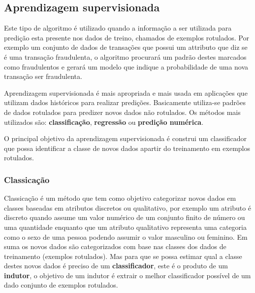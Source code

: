 \subsection{Aprendizagem supervisionada}
\label{subsec:supervised-learning}
Este tipo de algoritmo é utilizado quando a informação a ser utilizada para predição esta presente nos dados de treino, chamados de 
exemplos rotulados. Por exemplo um conjunto de dados de transações que possui um attributo que diz se é uma transação fraudulenta, o 
algoritmo procurará um padrão destes marcados como fraudulentos e gerará um modelo que indique a probabilidade de uma nova transação 
ser fraudulenta.

Aprendizagem supervisionada é mais apropriada e mais usada em aplicações que utilizam dados históricos para realizar predições. 
Basicamente utiliza-se padrões de dados rotulados para predizer novos dados não rotulados. 
Os métodos mais utilizados são: \textbf{classificação}, \textbf{regressão} ou \textbf{predição numérica}.

O principal objetivo da aprendizagem supervisionada é construi um classificador que possa identificar a classe de novos dados apartir
do treinamento em exemplos rotulados.     


\subsubsection{Classicação}
\label{subsubsec:classificacao}

Classicação é um método que tem como objetivo categorizar novos dados em classes baseadas em atributos discretos ou qualitativo,
por exemplo um atributo é discreto quando assume um valor numérico de um conjunto finito de número ou uma quantidade enquanto que um
atributo qualitativo representa uma categoria como o sexo de uma pessoa podendo assumir o valor masculino ou feminino.
Em suma os novos dados são categorizados com base nas classes dos dados de treinamento (exemplos rotulados). 
Mas para que se possa estimar qual a classe destes novos dados é preciso de um \textbf{classificador},
este é o produto de um \textbf{indutor}, o objetivo de um indutor é extrair o melhor classificador possível de um dado 
conjunto de exemplos rotulados.


